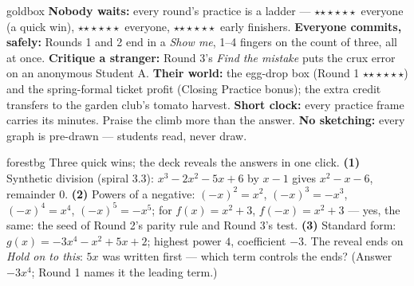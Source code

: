 \documentclass[10pt]{article}
\newcommand{\rung}[1]{{\color{goldacc}\ifcase#1\or$\star$\or$\star\star$\or$\star\star\star$\fi}}
\begin{document}
\begin{skillbox}{goldbox}
\textbf{Nobody waits:} every round's practice is a ladder --- \rung1\ everyone (a quick win),
\rung2\ everyone, \rung3\ early finishers. \textbf{Everyone commits, safely:} Rounds 1 and 2 end
in a \emph{Show me}, 1--4 fingers on the count of three, all at once. \textbf{Critique a
stranger:} Round 3's \emph{Find the mistake} puts the crux error on an anonymous Student A.
\textbf{Their world:} the egg-drop box (Round 1 \rung3) and the spring-formal ticket profit
(Closing Practice bonus); the extra credit transfers to the garden club's tomato harvest.
\textbf{Short clock:} every practice frame carries its minutes. Praise the climb more than the
answer. \textbf{No sketching:} every graph is pre-drawn --- students read, never draw.
\end{skillbox}

\begin{skillbox}{forestbg}
Three quick wins; the deck reveals the answers in one click. \textbf{(1)} Synthetic division
(spiral 3.3): $x^3-2x^2-5x+6$ by $x-1$ gives $x^2-x-6$, remainder $0$. \textbf{(2)} Powers of a
negative: $(-x)^2=x^2$, $(-x)^3=-x^3$, $(-x)^4=x^4$, $(-x)^5=-x^5$; for $f(x)=x^2+3$,
$f(-x)=x^2+3$ --- yes, the same: the seed of Round 2's parity rule and Round 3's test.
\textbf{(3)} Standard form: $g(x)=-3x^4-x^2+5x+2$; highest power $4$, coefficient $-3$. The
reveal ends on \emph{Hold on to this}: $5x$ was written first --- which term controls the ends?
(Answer $-3x^4$; Round 1 names it the leading term.)
\end{skillbox}
\end{document}
